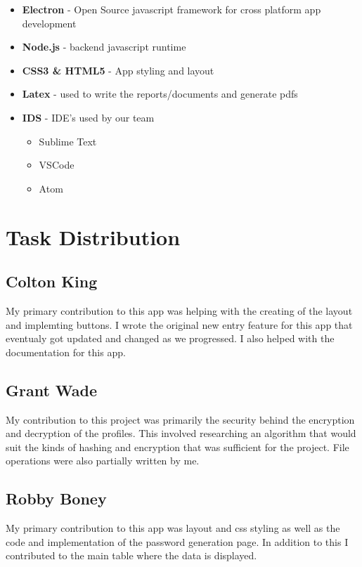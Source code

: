 \documentclass[11pt]{report}
\begin{document}
\begin{itemize}
    \item \textbf{Electron} - Open Source javascript framework for cross platform app development
    \item \textbf{Node.js} - backend javascript runtime
    \item \textbf{CSS3 \& HTML5} - App styling and layout
    \item \textbf{Latex} - used to write the reports/documents and generate pdfs
    \item \textbf{IDS} - IDE's used by our team 
        \begin{itemize}
            \item Sublime Text
            \item VSCode
            \item Atom
        \end{itemize}
\end{itemize}


\section{Task Distribution}

\subsection{Colton King}
My primary contribution to this app was helping with the creating of the layout
and implemting buttons. I wrote the original new entry feature for this app 
that eventualy got updated and changed as we progressed. I also helped with 
the documentation for this app.
\subsection{Grant Wade}
My contribution to this project was primarily the security behind the
encryption and decryption of the profiles. This involved researching 
an algorithm that would suit the kinds of hashing and encryption that
was sufficient for the project. File operations were also partially
written by me.


\subsection{Robby Boney}
My primary contribution to this app was layout and css styling as well as the 
code and implementation of the password generation page. In addition to this
I contributed to the main table where the data is displayed.
\end{document}
